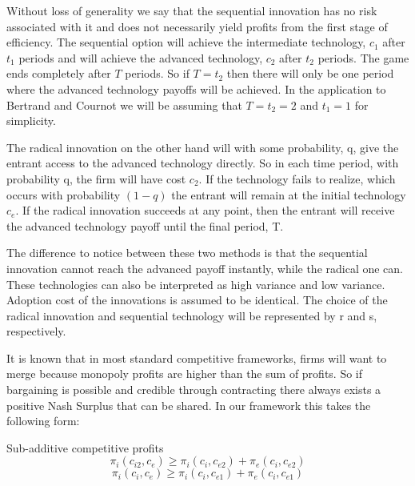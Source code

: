 Without loss of generality we say that the sequential innovation has no risk associated with it and does not necessarily yield profits from the first stage of efficiency. The sequential option will achieve the intermediate technology, $c_1$ after $t_1$ periods and will achieve the advanced technology, $c_2$ after $t_2$ periods. The game ends completely after $T$ periods. So if $T=t_2$ then there will only be one period where the advanced technology payoffs will be achieved. In the application to Bertrand and Cournot we will be assuming that $T=t_2=2$ and $t_1=1$ for simplicity. 


The radical innovation on the other hand will with some probability, q, give the entrant access to the advanced technology directly. So in each time period, with probability q, the firm will have cost $c_2$. If the technology fails to realize, which occurs with probability $(1-q)$ the entrant will remain at the initial technology $c_e$. If the radical innovation succeeds at any point, then the entrant will receive the advanced technology payoff until the final period, T. 


The difference to notice between these two methods is that the sequential innovation cannot reach the advanced payoff instantly, while the radical one can. These technologies can also be interpreted as high variance and low variance. Adoption cost of the innovations is assumed to be identical. The choice of the radical innovation and sequential technology will be represented by r and s, respectively.  


It is known that in most standard competitive frameworks, firms will want to merge because monopoly profits are higher than the sum of profits. So if bargaining is possible and credible through contracting there always exists a positive Nash Surplus that can be shared. In our framework this takes the following form: 

\begin{assumption}{Sub-additive competitive profits}
\begin{equation*}
\pi_{i}(c_{i2},c_{e}) \geq  \pi_{i}(c_{i},c_{e2}) + \pi_{e}(c_{i},c_{e2})
\end{equation*}
\begin{equation*}
\pi_{i}(c_{i},c_{e}) \geq  \pi_{i}(c_{i},c_{e1}) + \pi_{e}(c_{i},c_{e1})
\end{equation*}
\end{assumption}

